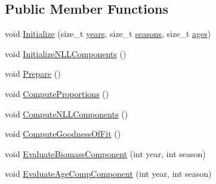 \subsection*{Public Member Functions}
\begin{DoxyCompactItemize}
\item 
void \hyperlink{structmas_1_1_survey_a853afce2d38c57ee46992f3a72b8d30e}{Initialize} (size\-\_\-t \hyperlink{structmas_1_1_survey_a62db9142400baea1e578c34ffa423d97}{years}, size\-\_\-t \hyperlink{structmas_1_1_survey_a823552ecb1c304d152b0befca7465394}{seasons}, size\-\_\-t \hyperlink{structmas_1_1_survey_a00478a5d1bf1272d220efde6560efe06}{ages})
\item 
void \hyperlink{structmas_1_1_survey_a9ffa08005fb5d846348be88e2103a298}{Initialize\-N\-L\-L\-Components} ()
\item 
void \hyperlink{structmas_1_1_survey_add6927885e43a0fcd5c538d6fe82ca42}{Prepare} ()
\item 
void \hyperlink{structmas_1_1_survey_ae32a9c02bbcc53e3d2146ddcb32eaed3}{Compute\-Proportions} ()
\item 
void \hyperlink{structmas_1_1_survey_a4608e42779725ea5d7f50b6b36758b25}{Compute\-N\-L\-L\-Components} ()
\item 
void \hyperlink{structmas_1_1_survey_ab152b25450461b5e23f3b9d862c77bfb}{Compute\-Goodness\-Of\-Fit} ()
\item 
void \hyperlink{structmas_1_1_survey_a895cdad735876fbf96584b20cdf81833}{Evaluate\-Biomass\-Component} (int year, int season)
\item 
void \hyperlink{structmas_1_1_survey_a8da55cc79c09a0a647369f6359157c92}{Evaluate\-Age\-Comp\-Component} (int year, int season)
\end{DoxyCompactItemize}
